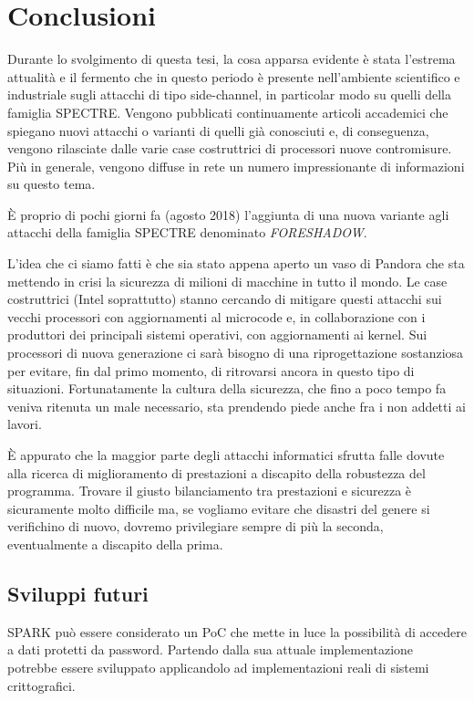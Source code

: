 \chapter{Conclusioni}
	Durante lo svolgimento di questa tesi, la cosa apparsa evidente è stata l'estrema attualità e il fermento che in questo periodo è presente nell'ambiente scientifico e industriale sugli attacchi di tipo side-channel, in particolar modo su quelli della famiglia SPECTRE. Vengono pubblicati continuamente articoli accademici che spiegano nuovi attacchi o varianti di quelli già conosciuti e, di conseguenza, vengono rilasciate dalle varie case costruttrici di processori nuove contromisure. Più in generale, vengono diffuse in rete un numero impressionante di informazioni su questo tema.
	
	\`{E} proprio di pochi giorni fa (agosto 2018) l'aggiunta di una nuova variante agli attacchi della famiglia SPECTRE denominato \emph{FORESHADOW}\cite{bulck2018foreshadow}.
	
	L'idea che ci siamo fatti è che sia stato appena aperto un vaso di Pandora che sta mettendo in crisi la sicurezza di milioni di macchine in tutto il mondo. Le case costruttrici (Intel soprattutto) stanno cercando di mitigare questi attacchi sui vecchi processori con aggiornamenti al microcode e, in collaborazione con i produttori dei principali sistemi operativi, con aggiornamenti ai kernel. Sui processori di nuova generazione ci sarà bisogno di una riprogettazione sostanziosa per evitare, fin dal primo momento, di ritrovarsi ancora in questo tipo di situazioni. Fortunatamente la cultura della sicurezza, che fino a poco tempo fa veniva ritenuta un male necessario, sta prendendo piede anche fra i non addetti ai lavori. 
	
	\`{E} appurato che la maggior parte degli attacchi informatici sfrutta falle dovute alla ricerca di miglioramento di prestazioni a discapito della robustezza del programma. Trovare il giusto bilanciamento tra prestazioni e sicurezza è sicuramente molto difficile ma, se vogliamo evitare che disastri del genere si verifichino di nuovo, dovremo privilegiare sempre di più la seconda, eventualmente a discapito della prima.
	
	\section{Sviluppi futuri}
		SPARK può essere considerato un \ac{PoC} che mette in luce la possibilità di accedere a dati protetti da password. Partendo dalla sua attuale implementazione potrebbe essere sviluppato applicandolo ad implementazioni reali di sistemi crittografici. 
		
